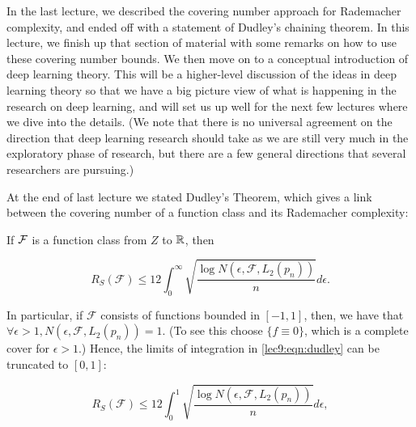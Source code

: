\setcounter{section}{0}



In the last lecture, we described the covering number approach for Rademacher complexity, and ended off with a statement of Dudley's chaining theorem. In this lecture, we finish up that section of material with some remarks on how to use these covering number bounds. We then move on to a conceptual introduction of deep learning theory. This will be a higher-level discussion of the ideas in deep learning theory so that we have a big picture view of what is happening in the research on deep learning, and will set us up well for the next few lectures where we dive into the details. (We note that there is no universal agreement on the direction that deep learning research should take as we are still very much in the exploratory phase of research, but there are a few general directions that several researchers are pursuing.)


At the end of last lecture we stated Dudley's Theorem, which gives a link between the covering number of a function class and its Rademacher complexity:

\begin{theorem}
If $\mathcal F$ is a function class from $Z$ to $\mathbb R$, then

\begin{equation}\label{lec9:eqn:dudley}
    R_S(\mathcal{F})\leq 12\int_{0}^{\infty}\sqrt{\frac{\log N(\epsilon, \mathcal{F}, L_2({p_n}))}{n}}d\epsilon.
\end{equation}

\end{theorem}

In particular, if $\mathcal{F}$ consists of functions bounded in $[-1,1]$, then, we have that $\forall \epsilon > 1, N(\epsilon, \mathcal{F}, L_2({p_n}))=1$. (To see this choose $\{f\equiv 0\}$, which is a complete cover for $\epsilon>1$.) Hence, the limits of integration in \eqref{lec9:eqn:dudley} can be truncated to $[0,1]$:
    
    \begin{equation}
    R_S(\mathcal{F})\leq 12\int_{0}^{1}\sqrt{\frac{\log N(\epsilon, \mathcal{F}, L_2({p_n}))}{n}}d\epsilon,
    \end{equation}
    
